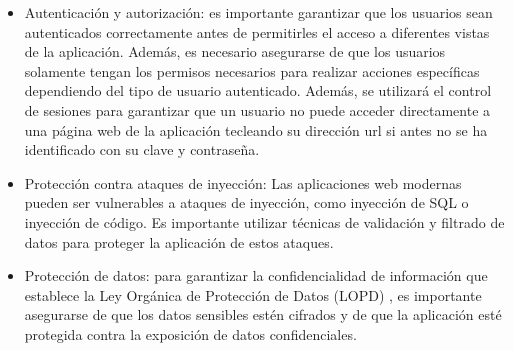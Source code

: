 \begin{itemize}
    \item Autenticación y autorización: es importante garantizar que los usuarios sean autenticados correctamente antes de permitirles el acceso a diferentes vistas de la aplicación. Además, es necesario asegurarse de que los usuarios solamente tengan los permisos necesarios para realizar acciones específicas dependiendo del tipo de usuario autenticado. Además, se utilizará el control de sesiones para garantizar que un usuario no puede acceder directamente a una página web de la aplicación tecleando su dirección url si antes no se ha identificado con su clave y contraseña.

    \item Protección contra ataques de inyección: Las aplicaciones web modernas pueden ser vulnerables a ataques de inyección, como inyección de SQL o inyección de código. Es importante utilizar técnicas de validación y filtrado de datos para proteger la aplicación de estos ataques.

    \item Protección de datos: para garantizar la confidencialidad de información que establece la Ley Orgánica de Protección de Datos (LOPD) \cite{lopd}, es importante asegurarse de que los datos sensibles estén cifrados y de que la aplicación esté protegida contra la exposición de datos confidenciales.
\end{itemize}


